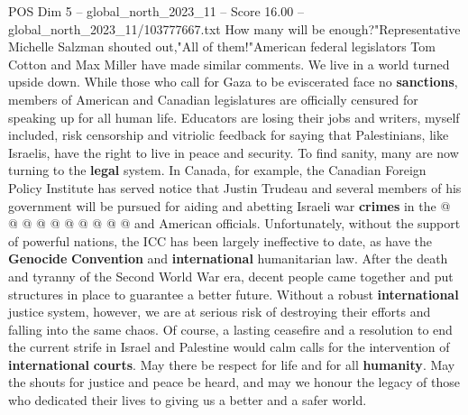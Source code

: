 \begin{textsample}{POS Dim 5 – global\_north\_2023\_11 – Score 16.00 – global\_north\_2023\_11/103777667.txt}
How many will be enough?"Representative Michelle Salzman shouted out,"All of them!"American federal legislators Tom Cotton and Max Miller have made similar comments.
We live in a world turned upside down.
While those who call for Gaza to be eviscerated face no \textbf{sanctions}, members of American and Canadian legislatures are officially censured for speaking up for all human life.
Educators are losing their jobs and writers, myself included, risk censorship and vitriolic feedback for saying that Palestinians, like Israelis, have the right to live in peace and security.
To find sanity, many are now turning to the \textbf{legal} system.
In Canada, for example, the Canadian Foreign Policy Institute has served notice that Justin Trudeau and several members of his government will be pursued for aiding and abetting Israeli war \textbf{crimes} in the @ @ @ @ @ @ @ @ @ @ and American officials.
Unfortunately, without the support of powerful nations, the ICC has been largely ineffective to date, as have the \textbf{Genocide} \textbf{Convention} and \textbf{international} humanitarian law.
After the death and tyranny of the Second World War era, decent people came together and put structures in place to guarantee a better future.
Without a robust \textbf{international} justice system, however, we are at serious risk of destroying their efforts and falling into the same chaos.
Of course, a lasting ceasefire and a resolution to end the current strife in Israel and Palestine would calm calls for the intervention of \textbf{international} \textbf{courts}.
May there be respect for life and for all \textbf{humanity}.
May the shouts for justice and peace be heard, and may we honour the legacy of those who dedicated their lives to giving us a better and a safer world.

\end{textsample}
